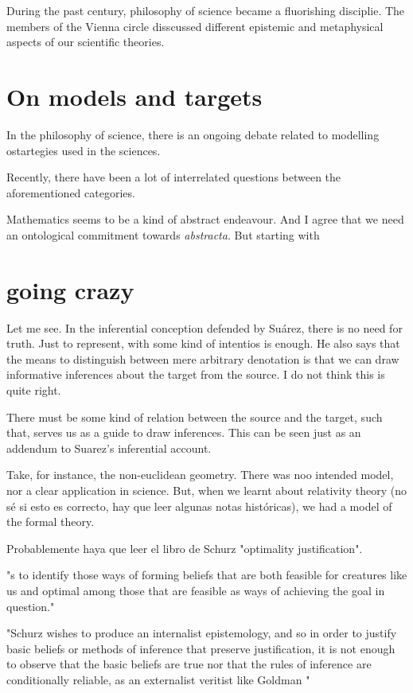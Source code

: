 During the past century, philosophy of science became a fluorishing disciplie.
The members of the Vienna circle disscussed different epistemic and metaphysical aspects of our scientific theories.


\section{On models and targets}

In the philosophy of science, there is an ongoing debate related to modelling ostartegies used in the sciences.

Recently, there have been a lot of interrelated questions between the aforementioned categories.


Mathematics seems to be a kind of abstract endeavour. And I agree that we need an ontological commitment towards \emph{abstracta}.
But starting with


\section{going crazy}

Let me see. In the inferential conception defended by Suárez, there is no need for truth. Just to represent, with some kind of intentios is enough. He also says that the means to distinguish between mere arbitrary denotation is that we can draw informative inferences about the target from the source. I do not think this is quite right.

There must be some kind of relation between the source and the target, such that, serves us as a guide to draw inferences. This can be seen just as an addendum to Suarez's inferential account.

Take, for instance, the non-euclidean geometry. There was noo intended model, nor a clear application in science. But, when we learnt about relativity theory (no sé si esto es correcto, hay que leer algunas notas históricas), we had a model of the formal theory.

Probablemente haya que leer el libro de Schurz "optimality justification".


"s to identify those ways of forming beliefs that are both feasible for creatures like us and optimal among those that are feasible as ways of achieving the goal in question."

"Schurz wishes to produce an internalist epistemology, and so in order to justify basic beliefs or methods of inference that preserve justification, it is not enough to observe that the basic beliefs are true nor that the rules of inference are conditionally reliable, as an externalist veritist like Goldman "


